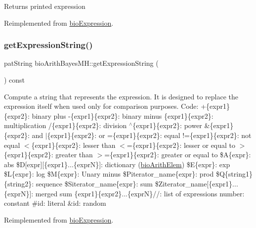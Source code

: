 \begin{DoxyReturn}{Returns}
printed expression 
\end{DoxyReturn}


Reimplemented from \hyperlink{classbio_expression_a66a83eb0caac18dd5e568ffde5a8b5d4}{bio\+Expression}.

\mbox{\label{classbio_arith_bayes_m_h_a0211e07769cd7b73f6dc344884656199}} 
\subsubsection{\texorpdfstring{get\+Expression\+String()}{getExpressionString()}}
{\footnotesize\ttfamily pat\+String bio\+Arith\+Bayes\+M\+H\+::get\+Expression\+String (\begin{DoxyParamCaption}{ }\end{DoxyParamCaption}) const\hspace{0.3cm}{\ttfamily [virtual]}}

Compute a string that represents the expression. It is designed to replace the expression itself when used only for comparison purposes. Code\+: +\{expr1\}\{expr2\}\+: binary plus -\/\{expr1\}\{expr2\}\+: binary minus \{expr1\}\{expr2\}\+: multiplication /\{expr1\}\{expr2\}\+: division $^\wedge$\{expr1\}\{expr2\}\+: power \&\{expr1\}\{expr2\}\+: and $\vert$\{expr1\}\{expr2\}\+: or =\{expr1\}\{expr2\}\+: equal !=\{expr1\}\{expr2\}\+: not equal $<$\{expr1\}\{expr2\}\+: lesser than $<$=\{expr1\}\{expr2\}\+: lesser or equal to $>$\{expr1\}\{expr2\}\+: greater than $>$=\{expr1\}\{expr2\}\+: greater or equal to \$A\{expr\}\+: abs \$D\mbox{[}expr\mbox{]}\mbox{[}\{expr1\}...\{exprN\}\mbox{]}\+: dictionary (\hyperlink{classbio_arith_elem}{bio\+Arith\+Elem}) \$E\{expr\}\+: exp \$L\{expr\}\+: log \$M\{expr\}\+: Unary minus \$\+Piterator\+\_\+name\{expr\}\+: prod \$Q\{string1\}\{string2\}\+: sequence \$\+Siterator\+\_\+name\{expr\}\+: sum \$\+Ziterator\+\_\+name\mbox{[}\{expr1\}...\{exprN\}\mbox{]}\+: merged sum \{expr1\}\{expr2\}...\{exprN\}//\+: list of expressions number\+: constant \#id\+: literal \&id\+: random 

Reimplemented from \hyperlink{classbio_expression_a3e4b4dca58dbbc6f0e411b30eb3f60b4}{bio\+Expression}.

\mbox{\label{classbio_arith_bayes_m_h_a9bf7951a901c6243af0ffc89bc5b6018}} 
